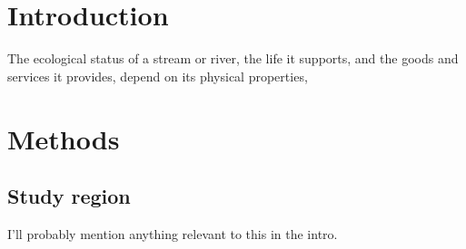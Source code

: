 \documentclass{article}
\begin{document}

\section*{Introduction}

The ecological status of a stream or river, the life it supports, and the goods and services it provides, depend on its physical properties, 

\section*{Methods}

\subsection*{Study region}

I'll probably mention anything relevant to this in the intro.
\end{document}
